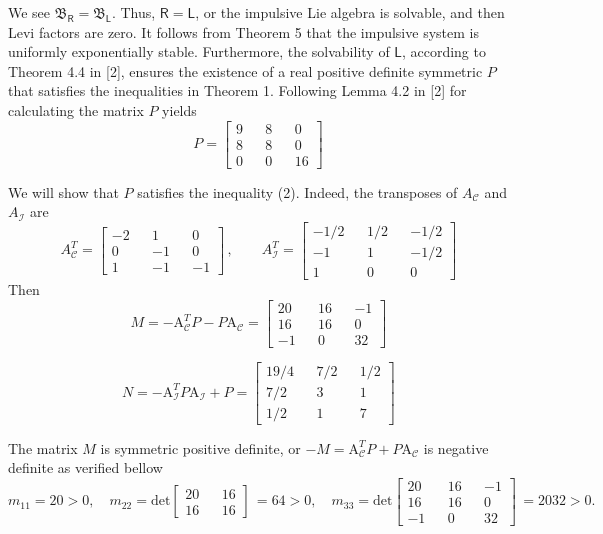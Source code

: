 \documentclass[11pt,a4paper]{article}
\begin{document}
We see $\mathfrak{B}_\mathsf{R} = \mathfrak{B}_\mathsf{L}$. Thus, $\mathsf{R} = \mathsf{L}$, or the impulsive Lie algebra is solvable, and then Levi factors are zero. It follows from Theorem 5 that the impulsive system is uniformly exponentially stable. Furthermore, the solvability of $\mathsf{L}$, according to Theorem 4.4 in [2], ensures the existence of a real positive definite symmetric $P$ that satisfies the inequalities in Theorem 1. Following Lemma 4.2 in [2] for calculating the matrix $P$ yields 
$$
P =
	\left[
	\begin{aligned}
	 9 && 8 &&  0  \\
	 8 && 8 &&  0  \\
	 0 && 0 && 16
	\end{aligned}
	\right]\
$$

We will show that $P$ satisfies the inequality (2). Indeed, the transposes of $A_{\mathcal{C}}$ and $A_{\mathcal{I}}$ are
$$
A^T_{\mathcal{C}} = 
	\left[
	\begin{aligned}
	-2 &&  1 &&  0  \\
	 0 && -1 &&  0  \\
	 1 && -1 && -1
	\end{aligned}
	\right]\,,
\qquad		
A^T_{\mathcal{I}} = 
	\left[
	\begin{aligned}
	-1/2 && 1/2 && -1/2 \\
	-1   && 1   && -1/2  \\
	 1   && 0   &&  0
	\end{aligned}
	\right]\,
$$
Then
$$
M = -\mathrm{A}^T_{\mathcal{C}}P - P\mathrm{A}_{\mathcal{C}} = 
	\left[
	\begin{aligned}
	20 && 16 && -1  \\
	16 && 16 &&  0  \\
	-1 &&  0 && 32
	\end{aligned}
	\right]\,	
$$

$$	
N = -\mathrm{A}^T_{\mathcal{I}}P\mathrm{A}_{\mathcal{I}} + P =
\left[
	\begin{aligned}
	19/4 && 7/2 && 1/2 \\
	7/2  && 3   && 1  \\
	1/2  && 1   && 7
	\end{aligned}
	\right]\, 
$$

The matrix $M$ is symmetric positive definite, or
$-M = \mathrm{A}^T_{\mathcal{C}}P + P\mathrm{A}_{\mathcal{C}}$ is negative definite as verified bellow
$$
m_{11} = 20 > 0, \quad
m_{22}= \mathrm{det}
\left[
	\begin{aligned}
 		 20 && 16 \\
 		 16 && 16
	\end{aligned}
\right]\, = 64 > 0, \quad
m_{33} = \mathrm{det}
	\left[
	\begin{aligned}
	20 && 16 && -1  \\
	16 && 16 &&  0  \\
	-1 &&  0 && 32
	\end{aligned}
	\right]\, = 2032 > 0.
$$
\\
\\
\end{document}
